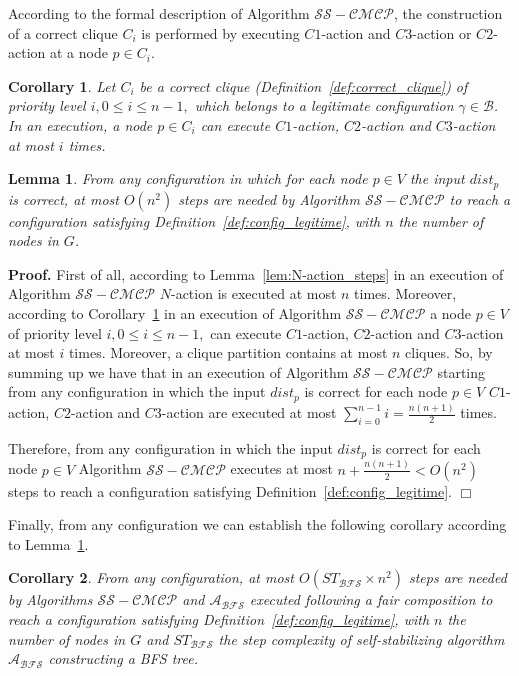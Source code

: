 \documentclass[11pt,letterpaper,onecolumn]{article}
\newtheorem{corollary}{Corollary}
\newtheorem{lemma}{Lemma}
\newenvironment{proof}{\noindent \begin{rm}{\textbf{Proof.} }}{\hspace*{\fill}$\Box$\par\end{rm} \vspace{.3cm}}
\begin{document}
According to the formal description of Algorithm $\mathcal{SS-CMCP}$, the construction of a correct clique $C_i$ is performed by executing $C1$-action and $C3$-action or $C2$-action at a node $p \in C_i$.

\begin{corollary}
\label{cor:other_actions_steps}
Let $C_i$ be a correct clique (Definition~\ref{def:correct_clique}) of priority level $i, 0 \leq i \leq n-1,$ which belongs to a legitimate configuration $\gamma \in \mathcal{B}$. In an execution, a node $p \in C_i$ can execute $C1$-action, $C2$-action and $C3$-action at most $i$ times.
\end{corollary}

\begin{lemma}
\label{lem:config_legitime_step}
From any configuration in which for each node $p \in V$ the input $dist_p$ is correct, at most $O(n^2)$ steps are needed by Algorithm $\mathcal{SS-CMCP}$ to reach a configuration satisfying Definition~\ref{def:config_legitime}, with $n$ the number of nodes in $G$.
\end{lemma}

\begin{proof}
First of all, according to Lemma~\ref{lem:N-action_steps} in an execution of Algorithm $\mathcal{SS-CMCP}$ $N$-action is executed at most $n$ times. Moreover, according to Corollary~\ref{cor:other_actions_steps} in an execution of Algorithm $\mathcal{SS-CMCP}$ a node $p \in V$ of priority level $i, 0 \leq i \leq n-1,$ can execute $C1$-action, $C2$-action and $C3$-action at most $i$ times. Moreover, a clique partition contains at most $n$ cliques. So, by summing up we have that in an execution of Algorithm $\mathcal{SS-CMCP}$ starting from any configuration in which the input $dist_p$ is correct for each node $p \in V$ $C1$-action, $C2$-action and $C3$-action are executed at most $\sum_{i=0}^{n-1}i=\frac{n(n+1)}{2}$ times.

Therefore, from any configuration in which the input $dist_p$ is correct for each node $p \in V$ Algorithm $\mathcal{SS-CMCP}$ executes at most $n+\frac{n(n+1)}{2}<O(n^2)$ steps to reach a configuration satisfying Definition~\ref{def:config_legitime}.
\end{proof}

Finally, from any configuration we can establish the following corollary according to Lemma~\ref{lem:config_legitime_step}.

\begin{corollary}
\label{cor:config_legitime_step_avec_BFS}
From any configuration, at most $O(ST_{\mathcal{BFS}} \times n^2)$ steps are needed by Algorithms $\mathcal{SS-CMCP}$ and $\mathcal{A_{BFS}}$ executed following a fair composition to reach a configuration satisfying Definition~\ref{def:config_legitime}, with $n$ the number of nodes in $G$ and $ST_{\mathcal{BFS}}$ the step complexity of self-stabilizing algorithm $\mathcal{A_{BFS}}$ constructing a BFS tree.
\end{corollary}
\end{document}

